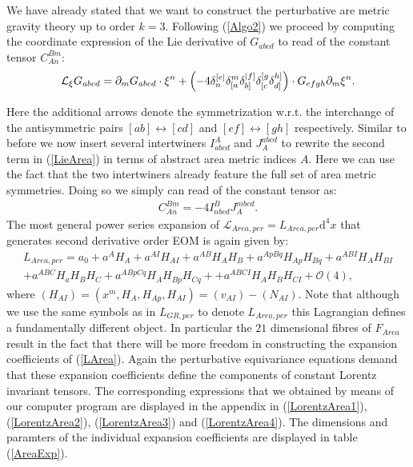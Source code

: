 \documentclass[a4paper,12pt, DIV=14, BCOR=5mm, twoside, headsepline]{scrbook}
\newcommand{\mathnode}[1]{%
   \mathord{\tikz[baseline=(#1.base), inner sep = 0pt]{\node (#1) {$\scriptstyle{#1}$};}}}
\begin{document}
We have already stated that we want to construct the perturbative are metric gravity theory up to order $k=3$. Following (\ref{Algo2}) we proceed by computing the coordinate expression of the Lie derivative of $G_{abcd}$ to read of the constant tensor $C_{An}^{Bm}$:
\begin{align}\label{LieArea}
    \mathcal{L}_{\xi} G_{abcd} = \partial_m G_{abcd} \cdot \xi^n + \left (-4 \delta_n^{[e\vert} \delta_{[\mathnode{a}}^m \delta_{b]}^{\vert \mathnode{f} ]} \delta_{[c}^{[g} \delta_{\mathnode{d}]}^{\mathnode{h}]} \right ) \cdot G_{efgh} \partial_m \xi^n.
\end{align}
Here the additional arrows denote the symmetrization w.r.t. the interchange of the antisymmetric pairs $[ab] \leftrightarrow [cd]$ and $[ef] \leftrightarrow [gh]$ respectively.
%
%
%
Similar to before we now insert several intertwiners $I^A_{abcd}$ and $J_A^{abcd}$ to rewrite the second term in (\ref{LieArea}) in terms of abstract area metric indices $A$. Here we can use the fact that the two intertwiners already feature the full set of area metric symmetries.  Doing so we simply can read of the constant tensor as:
\begin{align}
    C_{An}^{Bm} = -4 I^B_{nbcd} J_A^{mbcd}.
\end{align}
The most general power series expansion of $\mathcal{L}_{Area,per} = L_{Area,per}\mathrm{d}^4x$ that generates second derivative order EOM is again given by:
\begin{align}\label{LArea}
    L_{Area,per} =  a_0 + a^A H_A + a^{AI}H_{AI} + a^{AB} H_{A}H_{B} + a^{ApBq} H_{Ap}H_{Bq} + a^{ABI} H_{A} H_{BI} \\
    + a^{ABC} H_a H_B H_C + a^{ABpCq} H_{A}H_{Bp}H_{Cq} +
    + a^{ABCI} H_A H_B H_{CI} 
    + \mathcal{O}(4),
\end{align}
where $(H_{AI}) = (x^m,H_A,H_{Ap},H_{AI}) = (v_{AI}) - (N_{AI})$. Note that although we use the same symbols as in $L_{GR,per}$ to denote $L_{Area,per}$ this Lagrangian defines a fundamentally different object. In particular the $21$ dimensional fibres of  $F_{Area}$ result in the fact that there will be more freedom in constructing the expansion coefficients of (\ref{LArea}). Again the perturbative equivariance equations demand that these expansion coefficients define the components of constant Lorentz invariant tensors. The corresponding expressions that we obtained by means of our computer program are displayed in the appendix in (\ref{LorentzArea1}), (\ref{LorentzArea2}), (\ref{LorentzArea3}) and (\ref{LorentzArea4}). The dimensions and paramters of the individual expansion coefficients are displayed in table (\ref{AreaExp}).
\end{document}
